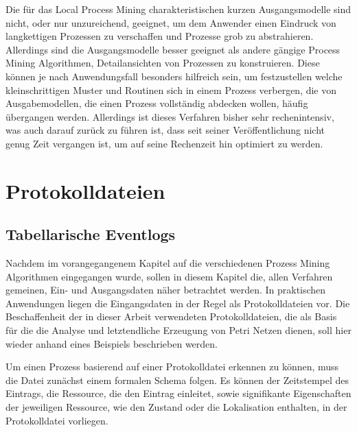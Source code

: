 Die für das Local Process Mining charakteristischen kurzen Ausgangsmodelle sind nicht, oder nur unzureichend, geeignet, um dem Anwender einen Eindruck von langkettigen Prozessen zu verschaffen und Prozesse grob zu abstrahieren. Allerdings sind die Ausgangsmodelle besser geeignet als andere gängige Process Mining Algorithmen, Detailansichten von Prozessen zu konstruieren. 
Diese können je nach Anwendungsfall besonders hilfreich sein, um festzustellen welche kleinschrittigen Muster und Routinen sich in einem Prozess verbergen, die von Ausgabemodellen, die einen Prozess vollständig abdecken wollen, häufig übergangen werden. Allerdings ist dieses Verfahren bisher sehr rechenintensiv, was auch darauf zurück zu führen ist, dass seit seiner Veröffentlichung nicht genug Zeit vergangen ist, um auf seine Rechenzeit hin optimiert zu werden.


\section{Protokolldateien}
\subsection{Tabellarische Eventlogs}
Nachdem im vorangegangenem Kapitel auf die verschiedenen Prozess Mining Algorithmen eingegangen wurde, sollen in diesem Kapitel die, allen Verfahren gemeinen, Ein- und Ausgangsdaten näher betrachtet werden.
In praktischen Anwendungen liegen die Eingangsdaten in der Regel als Protokolldateien vor. Die Beschaffenheit der in dieser Arbeit verwendeten  Protokolldateien, die als Basis für die die Analyse und letztendliche Erzeugung von Petri Netzen dienen, soll hier wieder anhand eines Beispiels beschrieben werden.

Um einen Prozess basierend auf einer Protokolldatei erkennen zu können, muss die Datei zunächst einem formalen Schema folgen. Es können der Zeitstempel des Eintrags, die Ressource, die den Eintrag einleitet, sowie signifikante Eigenschaften der jeweiligen Ressource, wie den Zustand oder die Lokalisation enthalten, in der Protokolldatei vorliegen.

